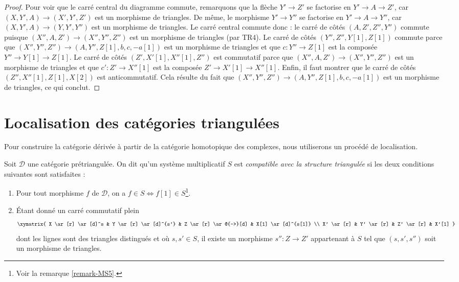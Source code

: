 \begin{proof}
\medskip\noindent
Pour voir que le carré central du diagramme commute, remarquons que la flèche
$Y' \to Z'$ se factorise en $Y' \to A \to Z'$, car
$(X, Y', A) \to (X', Y', Z')$ est un morphisme de triangles.
De même, le morphisme $Y' \to Y''$ se factorise en
$Y' \to A \to Y''$, car $(X, Y', A) \to (Y, Y', Y'')$ est un morphisme de
triangles. Le carré central commute donc : le carré de côtés
$(A, Z', Z'', Y'')$ commute puisque
$(X'', A, Z') \to (X'', Y'', Z'')$ est un morphisme de triangles (par TR4).
Le carré de côtés $(Y'', Z'', Y[1], Z[1])$ commute parce que
$(X'', Y'', Z'') \to (A, Y'', Z[1], b, c , -a[1])$ est un morphisme de
triangles et que $c : Y'' \to Z[1]$ est la composée
$Y'' \to Y[1] \to Z[1]$.
Le carré de côtés $(Z', X'[1], X''[1], Z'')$ est commutatif parce que
$(X'', A, Z') \to (X'', Y'', Z'')$ est un morphisme de triangles et que
$c' : Z' \to X''[1]$ est la composée $Z' \to X'[1] \to X''[1]$.
Enfin, il faut montrer que le carré de côtés
$(Z'', X''[1], Z[1], X[2])$ est anticommutatif. Cela résulte du fait que
$(X'', Y'', Z'') \to (A, Y'', Z[1], b, c , -a[1])$ est un morphisme de
triangles, ce qui conclut.
\end{proof}

\section{Localisation des catégories triangulées}
\label{section-localization}

\noindent
Pour construire la catégorie dérivée à partir de la catégorie homotopique des
complexes, nous utiliserons un procédé de localisation.

\begin{definition}
\label{definition-localization}
Soit $\mathcal{D}$ une catégorie prétriangulée. On dit qu'un système
multiplicatif $S$ est {\it compatible avec la structure triangulée} si les deux
conditions suivantes sont satisfaites :
\begin{enumerate}
\item[MS5] Pour tout morphisme $f$ de $\mathcal{D}$, on a
$f \in S \Leftrightarrow f[1] \in S$\footnote{Voir la remarque
\ref{remark-MS5}.}.
\item[MS6] Étant donné un carré commutatif plein
$$
\xymatrix{
X \ar[r] \ar[d]^s &
Y \ar[r] \ar[d]^{s'} &
Z \ar[r] \ar@{-->}[d] &
X[1] \ar[d]^{s[1]} \\
X' \ar[r] &
Y' \ar[r] &
Z' \ar[r] &
X'[1]
}
$$
dont les lignes sont des triangles distingués et où $s, s' \in S$, il existe
un morphisme $s'' : Z \to Z'$ appartenant à $S$ tel que $(s, s', s'')$ soit un
morphisme de triangles.
\end{enumerate}
\end{definition}

